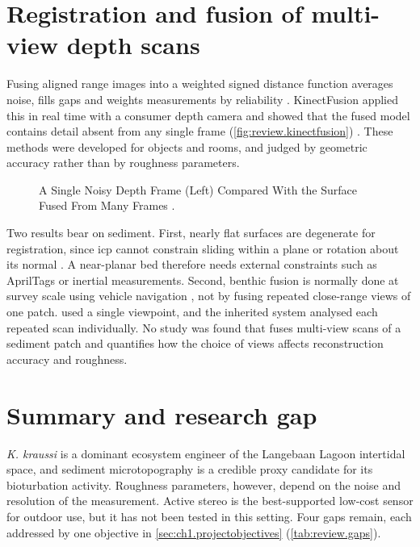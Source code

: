 \section{Registration and fusion of multi-view depth scans}
\label{sec:review.fusion}
Fusing aligned range images into a weighted signed distance function averages noise, fills gaps and weights measurements by reliability \citep{curlessVolumetricMethodBuilding1996}. KinectFusion applied this in real time with a consumer depth camera and showed that the fused model contains detail absent from any single frame (\autoref{fig:review.kinectfusion}) \citep{newcombeKinectFusionRealtimeDense2011}. These methods were developed for objects and rooms, and judged by geometric accuracy rather than by roughness parameters.

\begin{figure}[htbp]
	\centering
	\caption{A Single Noisy Depth Frame (Left) Compared With the Surface Fused From Many Frames \citep{newcombeKinectFusionRealtimeDense2011}.}
	\label{fig:review.kinectfusion}
\end{figure}

Two results bear on sediment. First, nearly flat surfaces are degenerate for registration, since \gls{icp} cannot constrain sliding within a plane or rotation about its normal \citep{gelfandGeometricallyStableSampling2003}. A near-planar bed therefore needs external constraints such as AprilTags \citep{olsonAprilTagRobustFlexible2011,wangAprilTag2Efficient2016} or inertial measurements. Second, benthic fusion is normally done at survey scale using vehicle navigation \citep{friedmanMultiScaleMeasuresRugosity2012}, not by fusing repeated close-range views of one patch. \citet{azharRGBDFrameworkCapturing2022} used a single viewpoint, and the inherited system analysed each repeated scan individually. No study was found that fuses multi-view scans of a sediment patch and quantifies how the choice of views affects reconstruction accuracy and roughness.

\section{Summary and research gap}
\label{sec:review.gap}
\textit{K. kraussi} is a dominant ecosystem engineer of the Langebaan Lagoon intertidal space, and sediment microtopography is a credible proxy candidate for its bioturbation activity. Roughness parameters, however, depend on the noise and resolution of the measurement. Active stereo is the best-supported low-cost sensor for outdoor use, but it has not been tested in this setting. Four gaps remain, each addressed by one objective in \autoref{sec:ch1.projectobjectives} (\autoref{tab:review.gaps}).

